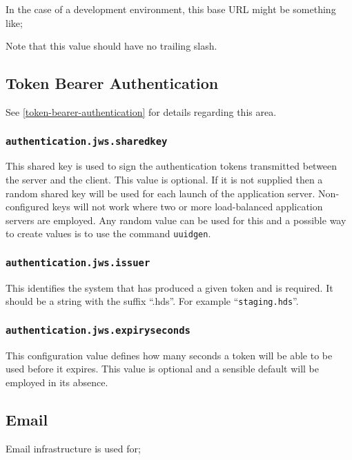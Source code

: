 In the case of a development environment, this base URL might be something like;


Note that this value should have no trailing slash.

\subsection{Token Bearer Authentication}

See \ref{token-bearer-authentication} for details regarding this area.

\subsubsection{\tt authentication.jws.sharedkey}

This shared key is used to sign the authentication tokens transmitted between the server and the client.  This value is optional.  If it is not supplied then a random shared key will be used for each launch of the application server.  Non-configured keys will not work where two or more load-balanced application servers are employed.  Any random value can be used for this and a possible way to create values is to use the command {\tt uuidgen}.

\subsubsection{\tt authentication.jws.issuer}

This identifies the system that has produced a given token and is required.  It should be a string with the suffix ``.hds''.  For example ``{\tt staging.hds}''.

\subsubsection{\tt authentication.jws.expiryseconds}

This configuration value defines how many seconds a token will be able to be used before it expires.  This value is optional and a sensible default will be employed in its absence.

\subsection{Email}

Email infrastructure is used for;

